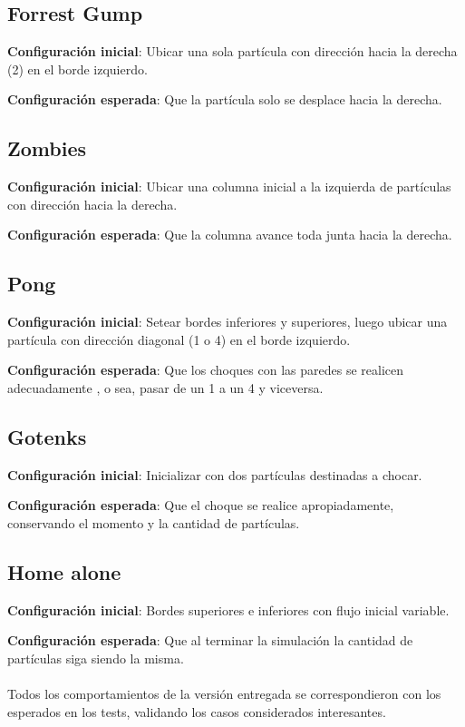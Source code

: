 \documentclass[10pt,a4paper]{article}
\begin{document}
\subsection*{Forrest Gump}
\textbf{Configuración inicial}: Ubicar una sola partícula con dirección hacia la derecha (2) en el borde izquierdo.

\textbf{Configuración esperada}: Que la partícula solo se desplace hacia la derecha.

\subsection*{Zombies}
\textbf{Configuración inicial}: Ubicar una columna inicial a la izquierda de partículas con dirección hacia la derecha. 


\textbf{Configuración esperada}: Que la columna avance toda junta hacia la derecha.

\subsection*{Pong}
\textbf{Configuración inicial}: Setear bordes inferiores y superiores, luego ubicar una partícula con dirección diagonal (1 o 4) en el borde izquierdo.  

\textbf{Configuración esperada}: Que los choques con las paredes se realicen adecuadamente , o sea, pasar de un 1 a un 4 y viceversa.

\subsection*{Gotenks}
\textbf{Configuración inicial}: Inicializar con dos partículas destinadas a chocar.


\textbf{Configuración esperada}: Que el choque se realice apropiadamente, conservando el momento y la cantidad de partículas.

\subsection*{Home alone}
\textbf{Configuración inicial}: Bordes superiores e inferiores con flujo inicial variable.


\textbf{Configuración esperada}: Que al terminar la simulación la cantidad de partículas siga siendo la misma.

\paragraph{}
Todos los comportamientos de la versión entregada se correspondieron con los esperados en los tests, validando los casos considerados interesantes.
\end{document}
